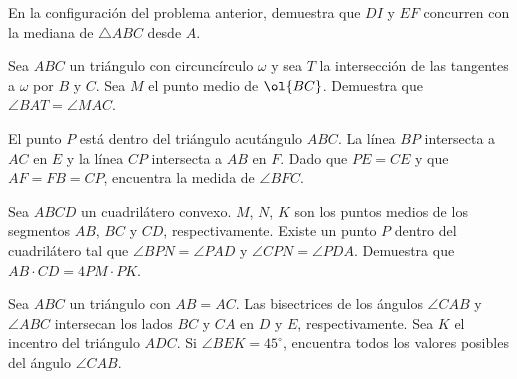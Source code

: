 \documentclass[11pt]{scrartcl}
\begin{document}
\begin{problem}
    

	En la configuración del problema anterior, demuestra que $DI$ y $EF$ concurren con la mediana de $\triangle ABC$ desde $A$. 


\end{problem}

\begin{problem}
    

	Sea $ABC$ un triángulo con circuncírculo $\omega$ y sea $T$ la intersección de las tangentes a $\omega$ por $B$ y $C$. Sea $M$ el punto medio
	de $\ol{BC}$. Demuestra que $\angle BAT = \angle MAC$.

\end{problem}



\begin{problem}%

	El punto $P$ está dentro del triángulo acutángulo $ABC$. La línea $BP$ intersecta a $AC$ en $E$ y la línea $CP$ intersecta a $AB$ en $F$.
	Dado que $PE = CE$ y que $AF = FB = CP$, encuentra la medida de $\angle BFC$.

\end{problem}

\begin{problem} %

	Sea $ABCD$ un cuadrilátero convexo. $M$, $N$, $K$ son los puntos medios de los segmentos $AB$, $BC$ y $CD$, respectivamente. Existe un 
	punto $P$ dentro del cuadrilátero tal que $\angle BPN = \angle PAD$ y $\angle CPN = \angle PDA$. Demuestra que $AB \cdot CD = 4PM \cdot PK$.

\end{problem}
\begin{problem}%

    Sea $ABC$ un triángulo con $AB=AC$. Las bisectrices de los ángulos $\angle CAB$ y $\angle ABC$ intersecan los lados $BC$ y $CA$ en $D$ y $E$, respectivamente. 
	Sea $K$ el incentro del triángulo $ADC$. Si $\angle BEK=45^\circ$, encuentra todos los valores posibles del ángulo $\angle CAB$.
    
\end{problem}
\end{document}
